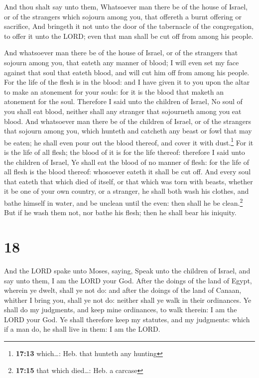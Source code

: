  And thou shalt say unto them, Whatsoever man there be of
the house of Israel, or of the strangers which sojourn among you, that
offereth a burnt offering or sacrifice,  And bringeth it
not unto the door of the tabernacle of the congregation, to offer it
unto the LORD; even that man shall be cut off from among his people.

 And whatsoever man there be of the house of Israel, or
of the strangers that sojourn among you, that eateth any manner of
blood; I will even set my face against that soul that eateth blood, and
will cut him off from among his people.  For the life of
the flesh is in the blood: and I have given it to you upon the altar to
make an atonement for your souls: for it is the blood that maketh an
atonement for the soul.  Therefore I said unto the
children of Israel, No soul of you shall eat blood, neither shall any
stranger that sojourneth among you eat blood.  And
whatsoever man there be of the children of Israel, or of the strangers
that sojourn among you, which hunteth and catcheth any beast or fowl
that may be eaten; he shall even pour out the blood thereof, and cover
it with dust.\footnote{\textbf{17:13} which\ldots: Heb. that hunteth any
  hunting}  For it is the life of all flesh; the blood of
it is for the life thereof: therefore I said unto the children of
Israel, Ye shall eat the blood of no manner of flesh: for the life of
all flesh is the blood thereof: whosoever eateth it shall be cut off.
 And every soul that eateth that which died of itself, or
that which was torn with beasts, whether it be one of your own country,
or a stranger, he shall both wash his clothes, and bathe himself in
water, and be unclean until the even: then shall he be clean.\footnote{\textbf{17:15}
  that which died\ldots: Heb. a carcase}  But if he wash
them not, nor bathe his flesh; then he shall bear his iniquity.

\hypertarget{section-17}{%
\section{18}\label{section-17}}

 And the LORD spake unto Moses, saying, 
Speak unto the children of Israel, and say unto them, I am the LORD your
God.  After the doings of the land of Egypt, wherein ye
dwelt, shall ye not do: and after the doings of the land of Canaan,
whither I bring you, shall ye not do: neither shall ye walk in their
ordinances.  Ye shall do my judgments, and keep mine
ordinances, to walk therein: I am the LORD your God.  Ye
shall therefore keep my statutes, and my judgments: which if a man do,
he shall live in them: I am the LORD.

